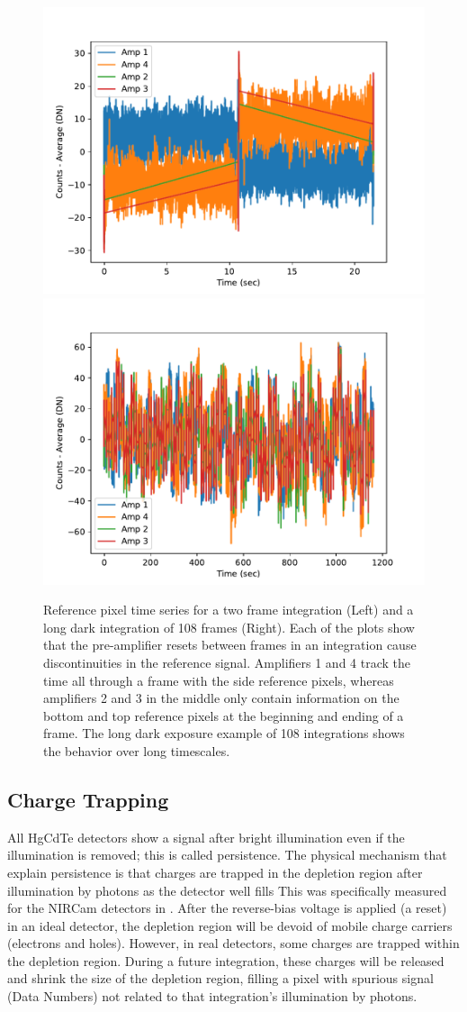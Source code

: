 \documentclass{aastex62}
\begin{document}
\begin{figure}[!hbtp]
\centering
\includegraphics[width=.49\columnwidth]{allamps.pdf}
\includegraphics[width=.49\columnwidth]{allamps_long_dark.pdf}
\caption{Reference pixel time series for a two frame integration (Left) and a long dark integration of 108 frames (Right). Each of the plots show that the pre-amplifier resets between frames in an integration cause discontinuities in the reference signal. Amplifiers 1 and 4 track the time all through a frame with the side reference pixels, whereas amplifiers 2 and 3 in the middle only contain information on the bottom and top reference pixels at the beginning and ending of a frame.
The long dark exposure example of 108 integrations shows the behavior over long timescales.}\label{fig:ampResetDark}
\end{figure}

\subsection{Charge Trapping}
All HgCdTe detectors show a signal after bright illumination even if the illumination is removed; this is called persistence.
The physical mechanism that explain persistence is that charges are trapped in the depletion region after illumination by photons as the detector well fills \citep{smith2008imgPersistence}
This was specifically measured for the NIRCam detectors in \citet{leisenring2016persistence}.
After the reverse-bias voltage is applied (a reset) in an ideal detector, the depletion region will be devoid of mobile charge carriers (electrons and holes).
However, in real detectors, some charges are trapped within the depletion region.
During a future integration, these charges will be released and shrink the size of the depletion region, filling a pixel with spurious signal (Data Numbers) not related to that integration's illumination by photons.
\end{document}
